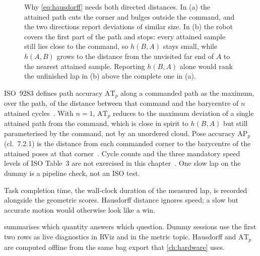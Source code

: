 \begin{figure}[htbp]
  \caption[Both directed Hausdorff distances are required]{%
    Why \cref{eq:hausdorff} needs both directed distances. In (a) the
    attained path cuts the corner and bulges outside the command, and the
    two directions report deviations of similar size. In (b) the robot
    covers the first part of the path and stops: every attained sample
    still lies close to the command, so $h(B,A)$ stays small, while
    $h(A,B)$ grows to the distance from the unvisited far end of $A$ to
    the nearest attained sample. Reporting $h(B,A)$ alone would rank the
    unfinished lap in (b) above the complete one in (a).}
  \label{fig:hausdorff-directions}
\end{figure}

ISO~9283 defines path accuracy $\mathrm{AT}_{p}$ along a commanded path
as the maximum, over the path, of the distance between that command and
the barycentre of $n$ attained cycles~\cite{ISO9283}. With $n=1$,
$\mathrm{AT}_{p}$ reduces to the maximum deviation of a single attained
path from the command, which is close in spirit to $h(B,A)$ but still
parameterised by the command, not by an unordered cloud. Pose accuracy
$\mathrm{AP}_{p}$ (cl.~7.2.1) is the distance from each commanded corner
to the barycentre of the attained poses at that
corner~\cite{ISO9283}. Cycle counts and the three mandatory
speed levels of ISO Table~3 are not exercised in this
chapter~\cite{ISO9283}. One slow lap on the dummy is a pipeline check,
not an ISO test.

Task completion time, the wall-clock duration of the measured lap, is
recorded alongside the geometric scores. Hausdorff distance ignores
speed; a slow but accurate motion would otherwise look like a win.

 summarises which quantity answers which question.
Dummy sessions use the first two rows as live diagnostics in RViz and in
the metric topic. Hausdorff and $\mathrm{AT}_{p}$ are computed
offline from the same bag export that \cref{ch:hardware} uses.

